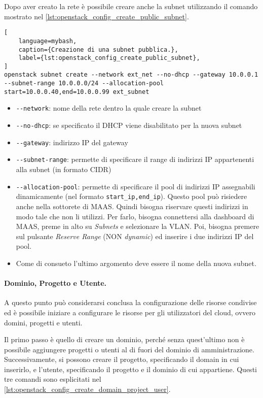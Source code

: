 \medskip\noindent
Dopo aver creato la rete è possibile creare anche la subnet utilizzando il comando mostrato nel \cref{lst:openstack_config_create_public_subnet}.

\begin{lstlisting}[
    language=mybash, 
    caption={Creazione di una subnet pubblica.},
    label={lst:openstack_config_create_public_subnet},
]
openstack subnet create --network ext_net --no-dhcp --gateway 10.0.0.1 --subnet-range 10.0.0.0/24 --allocation-pool start=10.0.0.40,end=10.0.0.99 ext_subnet
\end{lstlisting}
\begin{itemize}
    \item \verb|--network|: nome della rete dentro la quale creare la subnet
    \item \verb|--no-dhcp|: se specificato il DHCP viene disabilitato per la nuova subnet
    \item \verb|--gateway|: indirizzo IP del gateway
    \item \verb|--subnet-range|: permette di specificare il range di indirizzi IP appartenenti alla subnet (in formato CIDR)
    \item \verb|--allocation-pool|: permette di specificare il pool di indirizzi IP assegnabili dinamicamente (nel formato \verb|start_ip,end_ip|). Questo pool può risiedere anche nella sottorete di MAAS. Quindi bisogna riservare questi indirizzi in modo tale che non li utilizzi. Per farlo, bisogna connettersi alla dashboard di MAAS, preme in alto su \emph{Subnets} e selezionare la VLAN. Poi, bisogna premere sul pulsante \emph{Reserve Range} (NON \emph{dynamic}) ed inserire i due indirizzi IP del pool.
 \item Come di consueto l'ultimo argomento deve essere il nome della nuova subnet.
\end{itemize}


\paragraph{Dominio, Progetto e Utente.}
A questo punto può considerarsi conclusa la configurazione delle risorse condivise ed è possibile iniziare a configurare le risorse per gli utilizzatori del cloud, ovvero domini, progetti e utenti.

Il primo passo è quello di creare un dominio, perché senza quest'ultimo non è possibile aggiungere progetti o utenti al di fuori del dominio di amministrazione. Successivamente, si possono creare il progetto, specificando il domain in cui inserirlo, e l'utente, specificando il progetto e il dominio di cui appartiene. Questi tre comandi sono esplicitati nel \cref{lst:openstack_config_create_domain_project_user}.

